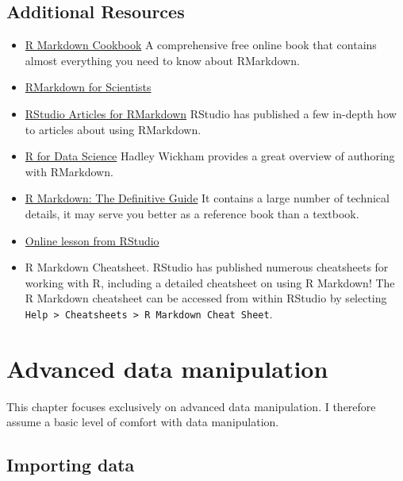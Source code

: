 \documentclass[
]{book}
\providecommand{\tightlist}{%
  \setlength{\itemsep}{0pt}\setlength{\parskip}{0pt}}
\begin{document}
\hypertarget{additional-resources}{%
\section{Additional Resources}\label{additional-resources}}

\begin{itemize}
\tightlist
\item
  \href{https://bookdown.org/yihui/rmarkdown-cookbook/}{R Markdown Cookbook}
  A comprehensive free online book that contains almost everything you need to know about RMarkdown.
\item
  \href{https://rmd4sci.njtierney.com/}{RMarkdown for Scientists}
\item
  \href{https://support.rstudio.com/hc/en-us/sections/200149716-R-Markdown}{RStudio Articles for RMarkdown}
  RStudio has published a few in-depth how to articles about using RMarkdown.
\item
  \href{https://r4ds.had.co.nz/index.html}{R for Data Science}
  Hadley Wickham provides a great overview of authoring with RMarkdown.
\item
  \href{https://bookdown.org/yihui/rmarkdown/}{R Markdown: The Definitive Guide}
  It contains a large number of technical details, it may serve you better as a reference book than a textbook.
\item
  \href{https://rmarkdown.rstudio.com/lesson-1.html}{Online lesson from RStudio}
\item
  R Markdown Cheatsheet. RStudio has published numerous cheatsheets for working with R, including a detailed cheatsheet on using R Markdown! The R Markdown cheatsheet can be accessed from within RStudio by selecting \texttt{Help\ \textgreater{}\ Cheatsheets\ \textgreater{}\ R\ Markdown\ Cheat\ Sheet}.
\end{itemize}

\hypertarget{advanced-data-manipulation}{%
\chapter{Advanced data manipulation}\label{advanced-data-manipulation}}

This chapter focuses exclusively on advanced data manipulation. I therefore assume a basic level of comfort with data manipulation.

\hypertarget{br-import}{%
\section{Importing data}\label{br-import}}
\end{document}
